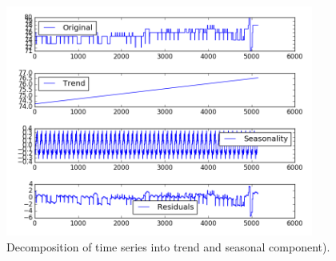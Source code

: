 \documentclass[12pt]{article}
\begin{document}
\begin{figure}
\includegraphics[width=0.9\textwidth]{11508/decomposition.png}
\caption{Decomposition of time series into trend and seasonal component).} \label{fg:decomp}
\end{figure}
\end{document}
